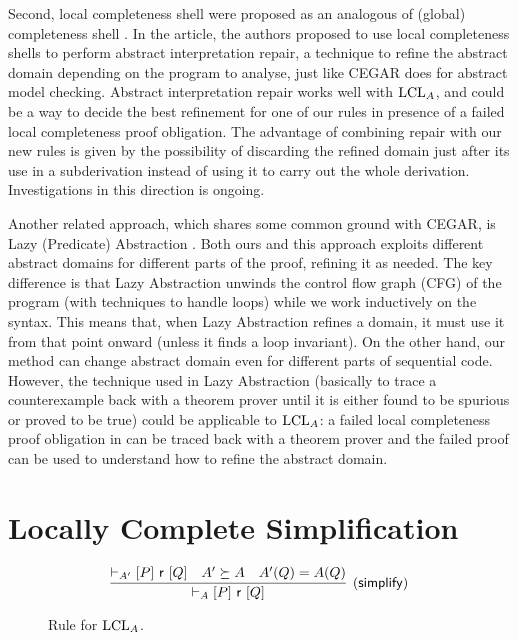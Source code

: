 Second, local completeness shell \cite{BGGR22} were proposed as an analogous of (global) completeness shell \cite{GRS00}. In the article, the authors proposed to use local completeness shells to perform abstract interpretation repair, a technique to refine the abstract domain depending on the program to analyse, just like CEGAR does for abstract model checking. Abstract interpretation repair works well with $\text{LCL}_A$, and could be a way to decide the best refinement for one of our rules in presence of a failed local completeness proof obligation. The advantage of combining repair with our new rules is given by the possibility of discarding the refined domain just after its use in a subderivation instead of using it to carry out the whole derivation. Investigations in this direction is ongoing.

Another related approach, which shares some common ground with CEGAR, is Lazy (Predicate) Abstraction \cite{HJMS02,McMillan06}. Both ours and this approach exploits different abstract domains for different parts of the proof, refining it as needed. The key difference is that Lazy Abstraction unwinds the control flow graph (CFG) of the program (with techniques to handle loops) while we work inductively on the syntax. This means that, when Lazy Abstraction refines a domain, it must use it from that point onward (unless it finds a loop invariant). On the other hand, our method can change abstract domain even for different parts of sequential code. However, the technique used in Lazy Abstraction (basically to trace a counterexample back with a theorem prover until it is either found to be spurious or proved to be true) could be applicable to $\text{LCL}_A$: a failed local completeness proof obligation in  can be traced back with a theorem prover and the failed proof can be used to understand how to refine the abstract domain.

\section{Locally Complete Simplification}
\begin{figure*}[t]
	\begin{framed}
		\[
		\infer[\lclrule{simplify}]
		{\lcl{A}{P}{\regr}{Q}}
		{\lcl{A'}{P}{\regr}{Q} & A' \succeq A & A'(Q) = A(Q)}
		\]
	\end{framed}
	\vspace{-1ex}
	\caption{Rule  for $\text{LCL}_A$.}\label{fig:lcla:rule-simplify}
\end{figure*}

